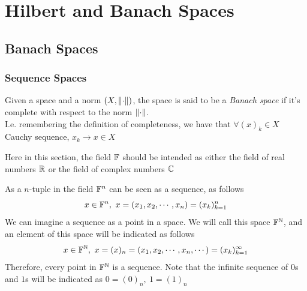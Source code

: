 \documentclass[../complete.tex]{subfiles}
\begin{document}
\chapter{Hilbert and Banach Spaces}
\section{Banach Spaces}
\subsection{Sequence Spaces}
\begin{dfn}
	Given a space and a norm $(X,\norm{\cdot})$, the space is said to be a \textit{Banach space} if it's complete with respect to the norm $\norm{\cdot}$.\\
	I.e. remembering the definition of completeness, we have that $\forall(x)_k\in X$ Cauchy sequence, $x_k\to x\in X$
\end{dfn}
\begin{ntn}
	Here in this section, the field $\mathbb{F}$ should be intended as either the field of real numbers $\mathbb{R}$ or the field of complex numbers $\mathbb{C}$
\end{ntn}
\begin{dfn}
	As a $n$-tuple in the field $\mathbb{F}^n$ can be seen as a sequence, as follows
	\begin{equation*}
		x\in\F^n,\ x=(x_1,x_2,\cdots,x_n)=(x_k)_{k=1}^n
	\end{equation*}
	We can imagine a sequence as a point in a space. We will call this space $\mathbb{F}^{\mathbb{N}}$, and an element of this space will be indicated as follows
	\begin{equation*}
		x\in\F^\N,\ x=(x)_n=(x_1,x_2,\cdots,x_n,\cdots)=(x_k)_{k=1}^\infty
	\end{equation*}
	Therefore, every point in $\mathbb{F}^{\mathbb{N}}$ is a sequence. Note that the infinite sequence of $0$s and $1$s will be indicated as $0=(0)_n,\ 1=(1)_n$
\end{dfn}
\end{document}
